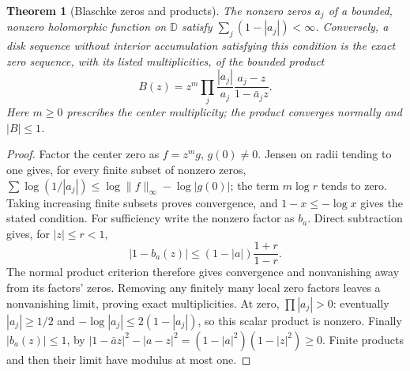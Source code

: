 \documentclass[11pt,a4paper,openany]{book}
\newtheorem{theorem}{Theorem}[chapter]
\theoremstyle{definition}
\theoremstyle{remark}\newtheorem{remark}[theorem]{Remark}
\newcommand{\D}{\mathbb D}\newcommand{\Chat}{\widehat{\mathbb C}}
\newcommand{\family}[1]{}
\begin{document}
\begin{theorem}[Blaschke zeros and products]\label{d12:17-06}\family{D12.17.06}
The nonzero zeros $a_j$ of a bounded, nonzero holomorphic function on
$\D$ satisfy $\sum_j(1-|a_j|)<\infty$. Conversely, a disk sequence
without interior accumulation satisfying this condition is the exact
zero sequence, with its listed multiplicities, of the bounded product
\[
             B(z)=z^m\prod_j\frac{|a_j|}{a_j}
                                      \frac{a_j-z}{1-\bar a_jz}.
\]
Here $m\ge0$ prescribes the center multiplicity; the product converges
normally and $|B|\le1$.
\end{theorem}
\begin{proof}
Factor the center zero as $f=z^m g$, $g(0)\ne0$. Jensen on radii
tending to one gives, for every finite subset of nonzero zeros,
$\sum\log(1/|a_j|)\le\log\|f\|_\infty-\log|g(0)|$; the term
$m\log r$ tends to zero. Taking increasing finite subsets proves
convergence, and $1-x\le-\log x$ gives the stated condition.
For sufficiency write the nonzero factor as $b_a$. Direct subtraction
gives, for $|z|\le r<1$,
\[
 |1-b_a(z)|\le(1-|a|)\frac{1+r}{1-r}.
\]
The normal product criterion therefore gives convergence and nonvanishing
away from its factors' zeros. Removing any finitely many local zero
factors leaves a nonvanishing limit, proving exact multiplicities. At
zero, $\prod|a_j|>0$: eventually $|a_j|\ge1/2$ and
$-\log|a_j|\le2(1-|a_j|)$, so this scalar product is nonzero.
Finally $|b_a(z)|\le1$, by
$|1-\bar az|^2-|a-z|^2=(1-|a|^2)(1-|z|^2)\ge0$.
Finite products and then their limit have modulus at most one.
\end{proof}
\end{document}
